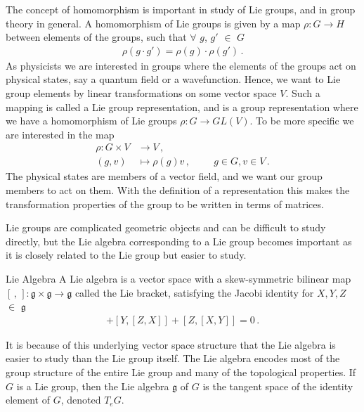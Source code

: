 The concept of homomorphism is important in study of Lie groups, and in group theory in general. A homomorphism of Lie groups is given by a map $\rho:G\rightarrow H$ between elements of the groups, such that $\forall$ $g$, $g'$ $\in$ $G$
\begin{align}
    \rho(g\cdot g')=\rho(g)\cdot\rho(g')\,.
\end{align}
As physicists we are interested in groups where the elements of the groups act on physical states, say a quantum field or a wavefunction. Hence, we want to  Lie group elements by linear transformations on some vector space $V$. Such a mapping is called a Lie group representation, and is a group representation where we have a homomorphism of Lie groups $\rho:G\rightarrow GL(V)$. To be more specific we are interested in the map
\begin{align}
    \rho:G\times V&\rightarrow V\,,
    \\
    (g,v)&\mapsto \rho(g)v\,,\hspace{1cm}g\in G,v\in V\,.
\end{align}
The physical states are members of a vector field, and we want our group members to act on them. With the definition of a representation this makes the transformation properties of the group to be written in terms of matrices.

Lie groups are complicated geometric objects and can be difficult to study directly, but the Lie algebra corresponding to a Lie group becomes important as it is closely related to the Lie group but easier to study.

\medskip
\begin{mydef}{Lie Algebra}{}
A Lie algebra is a vector space with a skew-symmetric bilinear map $[\,,\,]:\mathfrak{g}\times\mathfrak{g}\rightarrow\mathfrak{g}$ called the Lie bracket, satisfying the Jacobi identity for $X,Y,Z$ $\in$ $\mathfrak{g}$
\begin{align}
    [X,[Y,Z]+[Y,[Z,X]]+[Z,[X,Y]]=0\,.
\end{align}
\end{mydef}\noindent
It is because of this underlying vector space structure that the Lie algebra is easier to study than the Lie group itself. The Lie algebra encodes most of the group structure of the entire Lie group and many of the topological properties. If $G$ is a Lie group, then the Lie algebra $\mathfrak{g}$ of $G$ is the tangent space of the identity element of $G$, denoted $T_{e}G$.


